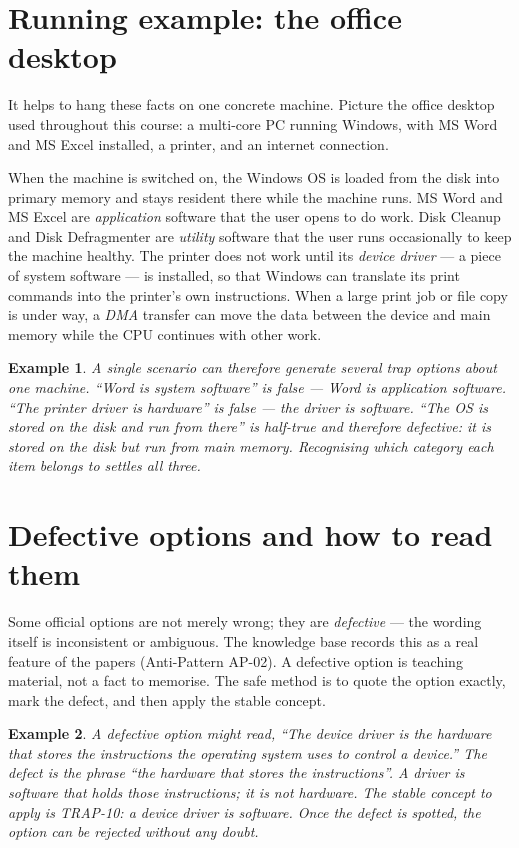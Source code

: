 \documentclass[11pt]{article}
\newtheorem{example}{Example}[section]
\begin{document}
\section{Running example: the office desktop}
It helps to hang these facts on one concrete machine. Picture the office
desktop used throughout this course: a multi-core PC running Windows, with
MS Word and MS Excel installed, a printer, and an internet connection.

When the machine is switched on, the Windows OS is loaded from the disk into
primary memory and stays resident there while the machine runs. MS Word and
MS Excel are \emph{application} software that the user opens to do work.
Disk Cleanup and Disk Defragmenter are \emph{utility} software that the user
runs occasionally to keep the machine healthy. The printer does not work
until its \emph{device driver} --- a piece of system software --- is
installed, so that Windows can translate its print commands into the
printer's own instructions. When a large print job or file copy is under way,
a \emph{DMA} transfer can move the data between the device and main memory
while the CPU continues with other work.

\begin{example}
A single scenario can therefore generate several trap options about one
machine. ``Word is system software'' is false --- Word is application
software. ``The printer driver is hardware'' is false --- the driver is
software. ``The OS is stored on the disk and run from there'' is half-true
and therefore defective: it is stored on the disk but \emph{run} from main
memory. Recognising which category each item belongs to settles all three.
\end{example}

\section{Defective options and how to read them}
Some official options are not merely wrong; they are \emph{defective} --- the
wording itself is inconsistent or ambiguous. The knowledge base records this
as a real feature of the papers (Anti-Pattern AP-02). A defective option is
teaching material, not a fact to memorise. The safe method is to quote the
option exactly, mark the defect, and then apply the stable concept.

\begin{example}
A defective option might read, ``The device driver is the hardware that
stores the instructions the operating system uses to control a device.'' The
defect is the phrase ``the hardware that stores the instructions''. A driver
is \emph{software} that holds those instructions; it is not hardware. The
stable concept to apply is TRAP-10: a device driver is software. Once the
defect is spotted, the option can be rejected without any doubt.
\end{example}
\end{document}
